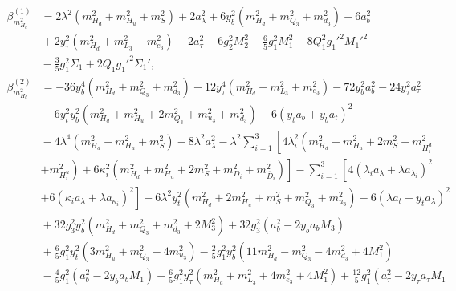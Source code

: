 \documentclass[preprint,amsmath,amssymb,aps,superscriptaddress,prd,
showpacs,floatfix,nofootinbib]{revtex4-1}
\begin{document}
\begin{subequations}
\begin{align}
\beta_{m_{H_d}^2}^{(1)} &= 2 \lambda^2 \left ( m_{H_d}^2 + m_{H_u}^2 +
m_S^2 \right ) + 2 a_\lambda^2 + 6 y_b^2 \left ( m_{H_d}^2 + m_{Q_3}^2 +
m_{d_3}^2 \right ) + 6 a_b^2 \nonumber \\
& {} + 2 y_\tau^2 \left ( m_{H_d}^2 + m_{L_3}^2 + m_{e_3}^2 \right ) +
2 a_\tau^2 - 6 g_2^2 M_2^2 - \frac{6}{5} g_1^2 M_1^2 - 8 Q_1^2 g_1'^2 M_1'^2
\nonumber \\
& {} - \frac{3}{5} g_1^2 \Sigma_1 + 2 Q_1 g_1'^2 \Sigma_1' ,
\label{eq:USSMmHd2BetaOneLoop} \\
\beta_{m_{H_d}^2}^{(2)} &= -36 y_b^4 \left ( m_{H_d}^2 + m_{Q_3}^2 +
m_{d_3}^2 \right ) - 12 y_\tau^4 \left ( m_{H_d}^2 + m_{L_3}^2 + m_{e_3}^2
\right ) - 72 y_b^2 a_b^2 - 24 y_\tau^2 a_\tau^2 \nonumber \\
& {} - 6 y_t^2 y_b^2 \left ( m_{H_d}^2 + m_{H_u}^2 + 2 m_{Q_3}^2 + m_{u_3}^2
+ m_{d_3}^2 \right ) - 6 \left ( y_t a_b + y_b a_t \right )^2 \nonumber \\
& {} - 4 \lambda^4 \left ( m_{H_d}^2 + m_{H_u}^2 + m_S^2 \right ) -
8 \lambda^2 a_\lambda^2 - \lambda^2 \sum_{i=1}^3 \left [ 4 \lambda_i^2
\left ( m_{H_d}^2 + m_{H_u}^2 + 2 m_S^2 + m_{H_i^d}^2 \right . \right .
\nonumber \\
& {} \left . \left . + m_{H_i^u}^2 \right ) + 6 \kappa_i^2 \left ( m_{H_d}^2
+ m_{H_u}^2 + 2 m_S^2 + m_{D_i}^2 + m_{\overline{D}_i}^2 \right ) \right ]
- \sum_{i=1}^3 \left [ 4 \left ( \lambda_i a_{\lambda} + \lambda a_{\lambda_i}
\right )^2 \right . \nonumber \\
& {} \left . + 6 \left ( \kappa_i a_\lambda + \lambda a_{\kappa_i} \right )^2
\right ] - 6 \lambda^2 y_t^2 \left ( m_{H_d}^2 + 2 m_{H_u}^2 + m_S^2 +
m_{Q_3}^2 + m_{u_3}^2 \right ) - 6 \left ( \lambda a_t + y_t a_\lambda
\right )^2 \nonumber \\
& {} + 32 g_3^2 y_b^2 \left ( m_{H_d}^2 + m_{Q_3}^2 + m_{d_3}^2 + 2 M_3^2
\right ) + 32 g_3^2 \left ( a_b^2 - 2 y_b a_b M_3 \right ) \nonumber \\
& {} + \frac{6}{5} g_1^2 y_t^2 \left ( 3 m_{H_u}^2 + m_{Q_3}^2 -
4 m_{u_3}^2 \right ) - \frac{2}{5} g_1^2 y_b^2 \left ( 11 m_{H_d}^2 -
m_{Q_3}^2 - 4 m_{d_3}^2 + 4 M_1^2 \right ) \nonumber \\
& {} - \frac{4}{5} g_1^2 \left ( a_b^2 - 2 y_b a_b M_1 \right ) +
\frac{6}{5} g_1^2 y_\tau^2 \left ( m_{H_d}^2 + m_{L_3}^2 + 4 m_{e_3}^2 +
4 M_1^2 \right ) + \frac{12}{5} g_1^2 \left ( a_\tau^2 - 2 y_\tau a_\tau M_1

\end{align}
\end{subequations}
\end{document}
